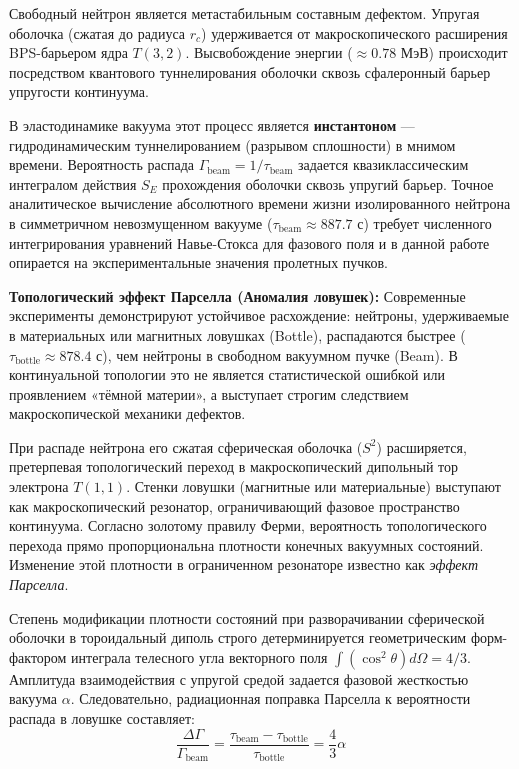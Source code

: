\documentclass[12pt,a4paper]{article}
\begin{document}
	Свободный нейтрон является метастабильным составным дефектом. Упругая оболочка (сжатая до радиуса $r_c$) удерживается от макроскопического расширения BPS-барьером ядра $T(3,2)$. Высвобождение энергии ($\approx 0.78$ МэВ) происходит посредством квантового туннелирования оболочки сквозь сфалеронный барьер упругости континуума.
	
	В эластодинамике вакуума этот процесс является \textbf{инстантоном} — гидродинамическим туннелированием (разрывом сплошности) в мнимом времени. Вероятность распада $\Gamma_{\text{beam}} = 1/\tau_{\text{beam}}$ задается квазиклассическим интегралом действия $S_E$ прохождения оболочки сквозь упругий барьер. Точное аналитическое вычисление абсолютного времени жизни изолированного нейтрона в симметричном невозмущенном вакууме ($\tau_{\text{beam}} \approx 887.7$ с) требует численного интегрирования уравнений Навье-Стокса для фазового поля и в данной работе опирается на экспериментальные значения пролетных пучков.
	
	\textbf{Топологический эффект Парселла (Аномалия ловушек):}
	Современные эксперименты демонстрируют устойчивое расхождение: нейтроны, удерживаемые в материальных или магнитных ловушках (Bottle), распадаются быстрее ($\tau_{\text{bottle}} \approx 878.4$ с), чем нейтроны в свободном вакуумном пучке (Beam). В континуальной топологии это не является статистической ошибкой или проявлением «тёмной материи», а выступает строгим следствием макроскопической механики дефектов.
	
	При распаде нейтрона его сжатая сферическая оболочка ($S^2$) расширяется, претерпевая топологический переход в макроскопический дипольный тор электрона $T(1,1)$. 
	Стенки ловушки (магнитные или материальные) выступают как макроскопический резонатор, ограничивающий фазовое пространство континуума. Согласно золотому правилу Ферми, вероятность топологического перехода прямо пропорциональна плотности конечных вакуумных состояний. Изменение этой плотности в ограниченном резонаторе известно как \textit{эффект Парселла}.
	
	Степень модификации плотности состояний при разворачивании сферической оболочки в тороидальный диполь строго детерминируется геометрическим форм-фактором интеграла телесного угла векторного поля $\int (\cos^2\theta) d\Omega = 4/3$. Амплитуда взаимодействия с упругой средой задается фазовой жесткостью вакуума $\alpha$. Следовательно, радиационная поправка Парселла к вероятности распада в ловушке составляет:
	\begin{equation}
		\frac{\Delta \Gamma}{\Gamma_{\text{beam}}} = \frac{\tau_{\text{beam}} - \tau_{\text{bottle}}}{\tau_{\text{bottle}}} = \frac{4}{3} \alpha
	\end{equation}
	
\end{document}
